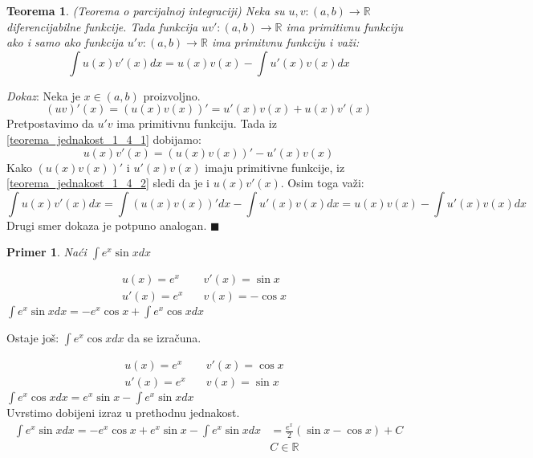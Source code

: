 \documentclass{article}
\newtheorem{teorema}{Teorema}[section]
\newtheorem{prim}{Primer}[section]
\begin{document}
\setcounter{equation}{0}
\begin{teoremabox}
    \begin{teorema} \label{teorema_1.4}
        (Teorema o parcijalnoj integraciji) Neka su
        $u, v: (a, b) \longrightarrow \mathbb{R}$ diferencijabilne
        funkcije. Tada funkcija $u v':(a, b) \longrightarrow \mathbb{R}$
        ima primitivnu funkciju ako i samo ako funkcija $u' v: (a, b) \longrightarrow \mathbb{R}$
        ima primitvnu funkciju i važi:
        $$\int u(x)v'(x)dx = u(x)v(x) -\int u'(x)v(x)dx$$
    \end{teorema}
\end{teoremabox}
\textit{Dokaz}: Neka je $x \in (a, b)$ proizvoljno.
\begin{equation}\label{teorema_jednakost_1_4_1}
    (uv)'(x) = (u(x) v(x))' = u'(x)v(x) + u(x)v'(x)
\end{equation}
Pretpostavimo da $u'v$ ima primitivnu funkciju. Tada iz \eqref{teorema_jednakost_1_4_1} dobijamo:
\begin{equation}\label{teorema_jednakost_1_4_2}
    u(x)v'(x) = (u(x) v(x))' - u'(x)v(x)
\end{equation}
Kako $(u(x)v(x))'$ i $u'(x)v(x)$ imaju primitivne funkcije,
iz \eqref{teorema_jednakost_1_4_2} sledi da je i $u(x)v'(x)$. Osim toga važi:
\begin{equation*}
    \int u(x)v'(x)dx = \int(u(x)v(x))'dx - \int u'(x)v(x)dx = u(x)v(x) -\int u'(x)v(x)dx
\end{equation*}
Drugi smer dokaza je potpuno analogan.
\null\hfill $\blacksquare$ \par
\begin{primbox}
    \begin{prim}
        Naći $\int e^x \sin x dx$
    \end{prim}
    \begin{align*}
        u(x) = e^x & \quad v'(x) = \sin x & \\ u'(x) = e^x &\quad v(x) = -\cos x
    \end{align*}
    $\int e^x\sin x dx = -e^x\cos x + \int e^x \cos xdx $\par
    Ostaje još: $\int e^x\cos x dx$ da se izračuna.\par
    \begin{align*}
        u(x) = e^x  & \quad v'(x) = \cos x & \\
        u'(x) = e^x & \quad v(x) = \sin x
    \end{align*}
    $\int e^x\cos x dx = e^x\sin x - \int e^x\sin x dx$\\
    Uvrstimo dobijeni izraz u prethodnu jednakost.
    \begin{align*}
        \int e^x \sin x dx = -e^x\cos x + e^x \sin x - \int e^x \sin x dx
         & = \frac{e^x}{2}(\sin x - \cos x) + C \\ & C \in \mathbb{R}
    \end{align*}
\end{primbox}
\end{document}
